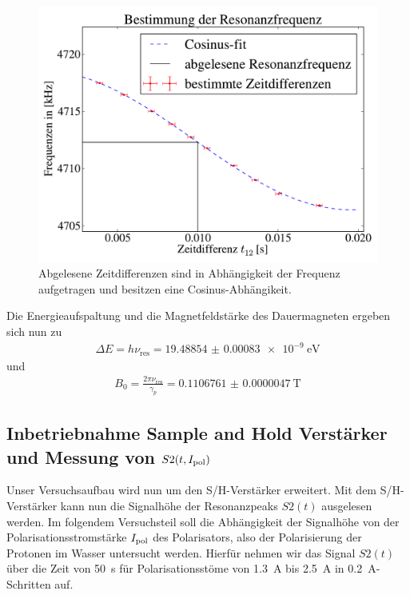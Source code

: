 \documentclass[paper=a4,
	fontsize=10pt,
	DIV=18,
	twocolumn,
	parskip=half
	]{scrartcl}
\numberwithin{equation}{section}    %
\begin{document}
\begin{figure}[htp]
	\begin{center}
		\includegraphics[width=\columnwidth]{Data-Plots/02-Resonanzfrequenz.pdf}
		\caption{Abgelesene Zeitdifferenzen sind in Abhängigkeit der Frequenz aufgetragen und besitzen eine Cosinus-Abhängikeit.}
		\label{resonanzfrequenz}
	\end{center}
\end{figure}
Die Energieaufspaltung und die Magnetfeldstärke des Dauermagneten ergeben sich nun zu
\begin{align}
	\Delta E =h\nu_{\mathrm{res}}=\SI[separate-uncertainty=false]{19.48854(83) e-9}{\electronvolt}
\end{align}
und
\begin{align}
	B_0=\frac{2 \pi \nu_{\mathrm{res}}}{\gamma_p}=\SI[separate-uncertainty=false]{0.1106761(47)}{\tesla}
\end{align}



\subsection{Inbetriebnahme Sample and Hold Verstärker und Messung von $S2(t,I_{\rm pol})$}
\label{auswertung4}

Unser Versuchsaufbau wird nun um den S/H-Verstärker erweitert. Mit dem S/H-Verstärker kann nun die Signalhöhe der Resonanzpeaks $S2(t)$ ausgelesen werden. Im folgendem Versuchsteil soll die Abhängigkeit der Signalhöhe von der Polarisationsstromstärke $I_{\rm pol}$ des Polarisators, also der Polarisierung der Protonen im Wasser untersucht werden. Hierfür nehmen wir das Signal $S2(t)$ über die Zeit von \SI{50}{\second} für Polarisationsstöme von \SI{1.3}{\ampere} bis \SI{2.5}{\ampere} in \SI{0.2}{\ampere}-Schritten auf.
\end{document}

